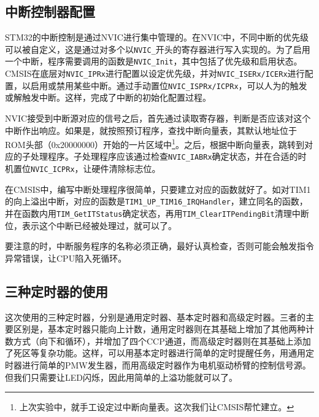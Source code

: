 \documentclass{ctexart}
\begin{document}
\subsection{中断控制器配置}

STM32的中断控制是通过NVIC进行集中管理的。在NVIC中，不同中断的优先级可以被自定义，这是通过对多个以\lstinline{NVIC_}开头的寄存器进行写入实现的。为了启用一个中断，程序需要调用的函数是\lstinline{NVIC_Init}，其中包括了优先级和启用状态。CMSIS在底层对\lstinline{NVIC_IPRx}进行配置以设定优先级，并对\lstinline{NVIC_ISERx/ICERx}进行配置，以启用或禁用某些中断。通过手动置位\lstinline{NVIC_ISPRx/ICPRx}，可以人为的触发或解触发中断。这样，完成了中断的初始化配置过程。

NVIC接受到中断源对应的信号之后，首先通过读取寄存器，判断是否应该对这个中断作出响应。如果是，就按照预订程序，查找中断向量表，其默认地址位于ROM头部（0x20000000）开始的一片区域中\footnote{上次实验中，就手工设定过中断向量表。这次我们让CMSIS帮忙建立。}。之后，根据中断向量表，跳转到对应的子处理程序。子处理程序应该通过检查\lstinline{NVIC_IABRx}确定状态，并在合适的时机置位\lstinline{NVIC_ICPRx}，让硬件清除标志位。

在CMSIS中，编写中断处理程序很简单，只要建立对应的函数就好了。如对TIM1的向上溢出中断，对应的函数是\lstinline{TIM1_UP_TIM16_IRQHandler}，建立同名的函数，并在函数内用\lstinline{TIM_GetITStatus}确定状态，再用\lstinline{TIM_ClearITPendingBit}清理中断位，表示这个中断已经被处理过，就可以了。

要注意的时，中断服务程序的名称必须正确，最好认真检查，否则可能会触发指令异常错误，让CPU陷入死循环。

\subsection{三种定时器的使用}

这次使用的三种定时器，分别是通用定时器、基本定时器和高级定时器。三者的主要区别是，基本定时器只能向上计数，通用定时器则在其基础上增加了其他两种计数方式（向下和循环），并增加了四个CCP通道，而高级定时器则在其基础上添加了死区等复杂功能。这样，可以用基本定时器进行简单的定时提醒任务，用通用定时器进行简单的PMW发生器，而用高级定时器作为电机驱动桥臂的控制信号源。但我们只需要让LED闪烁，因此用简单的上溢功能就可以了。
\end{document}

